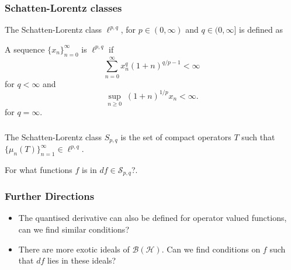 \documentclass{beamer}
\begin{document}
\begin{frame}
\frametitle{Schatten-Lorentz classes}
The Schatten-Lorentz class $\ell^{p,q}$, for $p \in (0,\infty)$ and $q \in (0,\infty]$ is defined as
\begin{definition}
    A sequence $\{x_n\}_{n=0}^\infty$ is $\ell^{p,q}$ if
    \begin{equation*}
        \sum_{n=0}^\infty x_n^q (1+n)^{q/p-1} < \infty
    \end{equation*}
    for $q < \infty$
    and
    \begin{equation*}
        \sup_{n\geq 0}\; (1+n)^{1/p}x_n < \infty.
    \end{equation*}
    for $q = \infty$.
\end{definition}
\end{frame}
\begin{frame}
\frametitle{}
\begin{definition}
The Schatten-Lorentz class $S_{p,q}$ is the set
of compact operators $T$ such that $\{\mu_n(T)\}_{n=1}^\infty \in \ell^{p,q}$.
\end{definition}
For what functions $f$ is in $df \in \mathcal{S}_{p,q}$?.
\end{frame}

\begin{frame}
\frametitle{Further Directions}
\begin{itemize}
    \item{} The quantised derivative can also be defined for operator valued functions,
    can we find similar conditions?
    \item{} There are more exotic ideals of $\mathcal{B}(\mathcal{H})$. Can we find conditions
    on $f$ such that $df$ lies in these ideals?
\end{itemize}
\end{frame}
\end{document}
